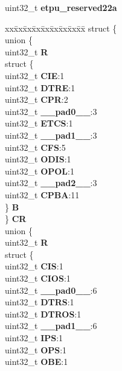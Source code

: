 \begin{DoxyCompactItemize}
\begin{tabbing}
\end{tabbing}\item 
\mbox{\label{structETPU__tag_ad5630bee7cac8b9c010c624c031ce233}} 
uint32\+\_\+t {\bfseries etpu\+\_\+reserved22a}
\item 
\mbox{\label{structETPU__tag_affd4b6e8619270693d415dc2523c37f0}} 
\begin{tabbing}
xx\=xx\=xx\=xx\=xx\=xx\=xx\=xx\=xx\=\kill
struct \{\\
\>union \{\\
\>\>uint32\_t {\bfseries R}\\
\>\>struct \{\\
\>\>\>uint32\_t {\bfseries CIE}:1\\
\>\>\>uint32\_t {\bfseries DTRE}:1\\
\>\>\>uint32\_t {\bfseries CPR}:2\\
\>\>\>uint32\_t {\bfseries \_\_pad0\_\_}:3\\
\>\>\>uint32\_t {\bfseries ETCS}:1\\
\>\>\>uint32\_t {\bfseries \_\_pad1\_\_}:3\\
\>\>\>uint32\_t {\bfseries CFS}:5\\
\>\>\>uint32\_t {\bfseries ODIS}:1\\
\>\>\>uint32\_t {\bfseries OPOL}:1\\
\>\>\>uint32\_t {\bfseries \_\_pad2\_\_}:3\\
\>\>\>uint32\_t {\bfseries CPBA}:11\\
\>\>\} {\bfseries B}\\
\>\} {\bfseries CR}\\
\>union \{\\
\>\>uint32\_t {\bfseries R}\\
\>\>struct \{\\
\>\>\>uint32\_t {\bfseries CIS}:1\\
\>\>\>uint32\_t {\bfseries CIOS}:1\\
\>\>\>uint32\_t {\bfseries \_\_pad0\_\_}:6\\
\>\>\>uint32\_t {\bfseries DTRS}:1\\
\>\>\>uint32\_t {\bfseries DTROS}:1\\
\>\>\>uint32\_t {\bfseries \_\_pad1\_\_}:6\\
\>\>\>uint32\_t {\bfseries IPS}:1\\
\>\>\>uint32\_t {\bfseries OPS}:1\\
\>\>\>uint32\_t {\bfseries OBE}:1\\

\end{tabbing}
\end{DoxyCompactItemize}
